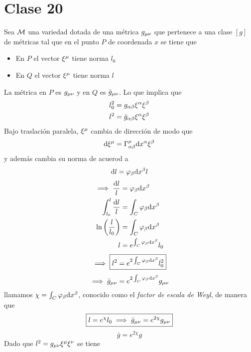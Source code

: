 \section{Clase 20}
Sea $\mathcal{M}$ una variedad dotada de una métrica $g_{\mu\nu }$ que pertenece a una clase $[g]$ de métricas tal que en el punto $P$ de coordenada $x$ se tiene que 
\begin{itemize}
	\item  En $P$ el vector $\xi ^\mu$ tiene norma $l_0$
	\item En $Q$ el vector $\xi ^\mu$ tiene norma $l$
\end{itemize}
La métrica en $P$ es $g_{\mu\nu }$ y en $Q$ es $\bar{g}_{\mu\nu }$. Lo que implica que
\begin{align}
  l_0^2&=g_{\alpha\beta }\xi^\alpha \xi^\beta \\
  l^2&=\bar{g}_{\alpha\beta }\xi^\alpha \xi^\beta 
\end{align}
Bajo traslación paralela, $\xi^\mu $ cambia de dirección de modo que
\begin{equation}
  \dd \xi ^\mu =\Gamma^\mu _{\alpha\beta }\dd x^\alpha \xi^\beta 
\end{equation}
y además cambia su norma de acuerod a 
\begin{equation}
  \dd l=\varphi_\beta \dd x^\beta l
\end{equation}
\begin{align}
  \implies\frac{\dd l}{l}&=\varphi_\beta \dd x^\beta \\
  \int_{l_0}^l\frac{\dd l}{l}&=\int_C\varphi_\beta \dd x^\beta \\
  \ln\left(\frac{l}{l_0}\right)&=\int_C\varphi_\beta \dd x^\beta \\
  l&=e^{\int_C\varphi_\beta \dd x^\beta }l_0
\end{align}
\begin{equation}
  \implies \boxed{l^2=e^{2\int_C\varphi_\beta \dd x^\beta }l^2_0}
\end{equation}
\begin{equation}
  \implies \bar{g}_{\mu\nu }=e^{2\int_C \varphi_\beta \dd x^\beta }g_{\mu\nu }
\end{equation}
llamamos $\chi=\int_C\varphi_\beta \dd x^\beta $, conocido como el \textit{factor de escala de Weyl}, de manera que
\begin{equation}
  \boxed{l=e^{\chi }l_0\implies \bar{g}_{\mu\nu }=e^{2\chi }g_{\mu\nu }}
\end{equation}
\begin{equation}
\boxed{  \bar{g}=e^{2\chi }g}
\end{equation}
Dado que $l^2=g_{\mu\nu }\xi^\mu \xi^\nu $ se tiene
